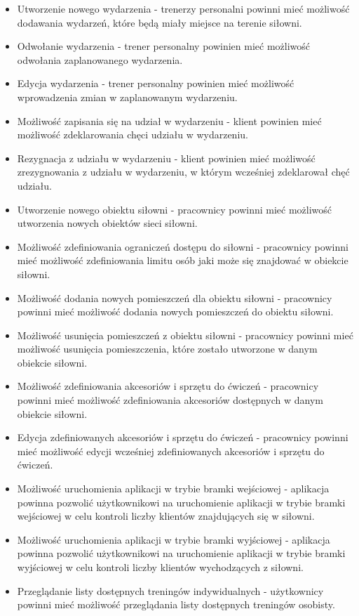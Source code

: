 \documentclass[a4paper,twoside,12pt]{book}
\begin{document}
\begin{itemize}
			\item Utworzenie nowego wydarzenia - trenerzy personalni powinni mieć możliwość dodawania wydarzeń, które będą miały miejsce na terenie siłowni.
			\item Odwołanie wydarzenia - trener personalny powinien mieć możliwość odwołania zaplanowanego wydarzenia.
			\item Edycja wydarzenia - trener personalny powinien mieć możliwość wprowadzenia zmian w zaplanowanym wydarzeniu.
			\item Możliwość zapisania się na udział w wydarzeniu - klient powinien mieć możliwość zdeklarowania chęci udziału w wydarzeniu.
			\item Rezygnacja z udziału w wydarzeniu - klient powinien mieć możliwość zrezygnowania z udziału w wydarzeniu, w którym wcześniej zdeklarował chęć udziału.
			\item Utworzenie nowego obiektu siłowni - pracownicy powinni mieć możliwość utworzenia nowych obiektów sieci siłowni.
			\item Możliwość zdefiniowania ograniczeń dostępu do siłowni - pracownicy powinni mieć możliwość zdefiniowania limitu osób jaki może się znajdować w obiekcie siłowni.
			\item Możliwość dodania nowych pomieszczeń dla obiektu siłowni - pracownicy powinni mieć możliwość dodania nowych pomieszczeń do obiektu siłowni.
			\item Możliwość usunięcia pomieszczeń z obiektu siłowni - pracownicy powinni mieć możliwość usunięcia pomieszczenia, które zostało utworzone w danym obiekcie siłowni.
			\item Możliwość zdefiniowania akcesoriów i sprzętu do ćwiczeń - pracownicy powinni mieć możliwość zdefiniowania akcesoriów dostępnych w danym obiekcie siłowni.
			\item Edycja zdefiniowanych akcesoriów i sprzętu do ćwiczeń - pracownicy powinni mieć możliwość edycji wcześniej zdefiniowanych akcesoriów i sprzętu do ćwiczeń.
			\item Możliwość uruchomienia aplikacji w trybie bramki wejściowej - aplikacja powinna pozwolić użytkownikowi na uruchomienie aplikacji w trybie bramki wejściowej w celu kontroli liczby klientów znajdujących się w siłowni.
			\item Możliwość uruchomienia aplikacji w trybie bramki wyjściowej - aplikacja powinna pozwolić użytkownikowi na uruchomienie aplikacji w trybie bramki wyjściowej w celu kontroli liczby klientów wychodzących z siłowni.
			\item Przeglądanie listy dostępnych treningów indywidualnych - użytkownicy powinni mieć możliwość przeglądania listy dostępnych treningów osobisty.

\end{itemize}
\end{document}
